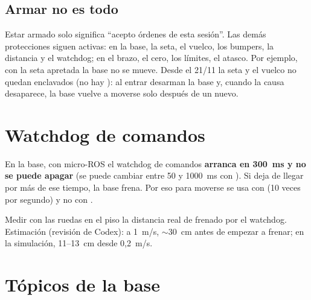 \subsection{Armar no es todo}
Estar armado solo significa ``acepto órdenes de esta sesión''. Las demás protecciones siguen activas: en la base, la
seta, el vuelco, los bumpers, la distancia y el watchdog; en el brazo, el cero, los límites, el atasco. Por ejemplo,
con la seta apretada la base no se mueve. Desde el 21/11 la seta y el vuelco no quedan enclavados (no hay ):
al entrar desarman la base y, cuando la causa desaparece, la base vuelve a moverse solo después de un 
nuevo.

\section{Watchdog de comandos}

En la base, con micro-ROS el watchdog de comandos \textbf{arranca en 300~ms y no se puede apagar} (se puede cambiar
entre 50 y 1000~ms con ). Si  deja de llegar por más de ese tiempo, la base frena. Por eso
 para moverse se usa con  (10 veces por segundo) y no con .

\begin{pendiente}
Medir con las ruedas en el piso la distancia real de frenado por el watchdog. Estimación (revisión de Codex): a
1~m/s, $\sim$30~cm antes de empezar a frenar; en la simulación, 11--13~cm desde 0,2~m/s.
\end{pendiente}

\section{Tópicos de la base}

